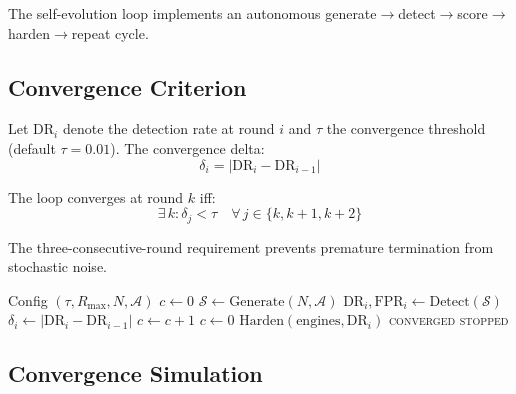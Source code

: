 \documentclass[11pt,twocolumn]{article}
\begin{document}
The self-evolution loop implements an autonomous generate$\to$detect$\to$score$\to$harden$\to$repeat cycle.

\subsection{Convergence Criterion}

Let $\text{DR}_i$ denote the detection rate at round $i$ and $\tau$ the convergence threshold (default $\tau = 0.01$). The convergence delta:
\begin{equation}
\delta_i = |\text{DR}_i - \text{DR}_{i-1}|
\label{eq:delta}
\end{equation}

The loop converges at round $k$ iff:
\begin{equation}
\exists \, k : \delta_j < \tau \quad \forall \, j \in \{k, k+1, k+2\}
\label{eq:converge}
\end{equation}

The three-consecutive-round requirement prevents premature termination from stochastic noise.

\begin{algorithm}[t]
\caption{Self-Evolution Loop}
\label{alg:evolution}
\begin{algorithmic}[1]
\Require Config $(\tau, R_{\max}, N, \mathcal{A})$
\State $c \gets 0$ 
  \State $\mathcal{S} \gets \text{Generate}(N, \mathcal{A})$ 
  \State $\text{DR}_i, \text{FPR}_i \gets \text{Detect}(\mathcal{S})$ 
  \State $\delta_i \gets |\text{DR}_i - \text{DR}_{i-1}|$
    \State $c \gets c + 1$
  \Else
    \State $c \gets 0$
  \EndIf
  \State $\text{Harden}(\text{engines}, \text{DR}_i)$ 
    \State \Return \textsc{converged}
  \EndIf
\EndFor
\State \Return \textsc{stopped}
\end{algorithmic}
\end{algorithm}

\subsection{Convergence Simulation}
\end{document}
